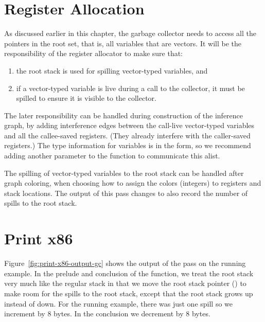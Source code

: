 \documentclass[11pt]{book}
\begin{document}
\clearpage

\section{Register Allocation}
\label{sec:reg-alloc-gc}

As discussed earlier in this chapter, the garbage collector needs to
access all the pointers in the root set, that is, all variables that
are vectors. It will be the responsibility of the register allocator
to make sure that:
\begin{enumerate}
\item the root stack is used for spilling vector-typed variables, and
\item if a vector-typed variable is live during a call to the
  collector, it must be spilled to ensure it is visible to the
  collector.
\end{enumerate}

The later responsibility can be handled during construction of the
inference graph, by adding interference edges between the call-live
vector-typed variables and all the callee-saved registers. (They
already interfere with the caller-saved registers.)  The type
information for variables is in the  form, so we
recommend adding another parameter to the 
function to communicate this alist.

The spilling of vector-typed variables to the root stack can be
handled after graph coloring, when choosing how to assign the colors
(integers) to registers and stack locations. The  output
of this pass changes to also record the number of spills to the root
stack.

%





\section{Print x86}
\label{sec:print-x86-gc}

Figure~\ref{fig:print-x86-output-gc} shows the output of the
 pass on the running example. In the prelude and
conclusion of the  function, we treat the root stack very
much like the regular stack in that we move the root stack pointer
() to make room for the spills to the root stack, except
that the root stack grows up instead of down.  For the running
example, there was just one spill so we increment  by 8
bytes. In the conclusion we decrement  by 8 bytes.
\end{document}
